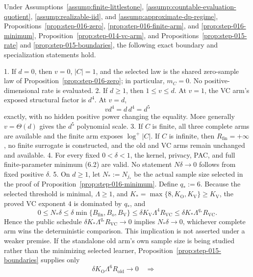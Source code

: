 \begin{proposition}\label{prop:step-016-frontier}
Under Assumptions~\ref{assump:finite-littlestone},
\ref{assump:countable-evaluation-quotient},
\ref{assump:realizable-iid}, and
\ref{assump:approximate-dp-regime},
Propositions~\ref{prop:step-016-zero},
\ref{prop:step-016-finite-arm}, and
\ref{prop:step-016-minimum}, Proposition~\ref{prop:step-014-vc-arm}, and 
Propositions~\ref{prop:step-015-rate} and
\ref{prop:step-015-boundaries}, the following exact boundary and
specialization statements hold.

1. If \(d=0\), then \(v=0\), \(|C|=1\), and the selected law is the shared
   zero-sample law of Proposition~\ref{prop:step-016-zero}; in particular,
   \(m_C=0\). No positive-dimensional rate is evaluated.
2. If \(d\ge1\), then \(1\le v\le d\). At \(v=1\), the VC arm's exposed
   structural factor is \(d^4\). At \(v=d\),
   \[
   vd^4=d\,d^4=d^5
   \tag{7.1}
   \]
   exactly, with no hidden positive power changing the equality. More
   generally \(v=\Theta(d)\) gives the \(d^5\) polynomial scale.
3. If \(C\) is finite, all three complete arms are available and the finite
   arm exposes \(\log^+|C|\). If \(C\) is infinite, then
   \(R_{\mathrm{fin}}=+\infty\), no finite surrogate is constructed, and the
   old and VC arms remain unchanged and available.
4. For every fixed \(0<\delta<1\), the kernel, privacy, PAC, and full
   finite-parameter minimum (6.2) are valid. No statement
   \(N\delta\to0\) follows from fixed positive \(\delta\).
5. On \(d\ge1\), let \(N_*:=N_{j_*}\) be the actual sample size selected in
   the proof of Proposition~\ref{prop:step-016-minimum}. Define \(q_*:=6\).
   Because the selected threshold is minimal, \(\Lambda\ge1\), and
   \(K_*=\max\{8,K_{\mathrm O},K_{\mathrm V}\}\ge K_{\mathrm V}\),
   the proved VC exponent \(4\) is dominated by \(q_*\), and
   \[
   0\le N_*\delta
   \le\delta\min\{B_{\mathrm{fin}},B_{\mathrm o},B_{\mathrm V}\}
   \le\delta K_{\mathrm V}\Lambda^4R_{\mathrm{VC}}
   \le\delta K_*\Lambda^{q_*}R_{\mathrm{VC}}.
   \tag{7.2}
   \]
   Hence the public schedule
   \(\delta K_*\Lambda^{q_*}R_{\mathrm{VC}}\to0\) implies
   \(N_*\delta\to0\), whichever complete arm wins the deterministic
   comparison. This implication is not asserted under a weaker premise.
   If the standalone old arm's own sample size is being studied rather than
   the minimizing selected learner, Proposition~\ref{prop:step-015-boundaries} supplies only
   \[
   \delta K_{\mathrm O}\Lambda^6R_{\mathrm{old}}\to0
   \quad\Longrightarrow\quad
\]
\end{proposition}
